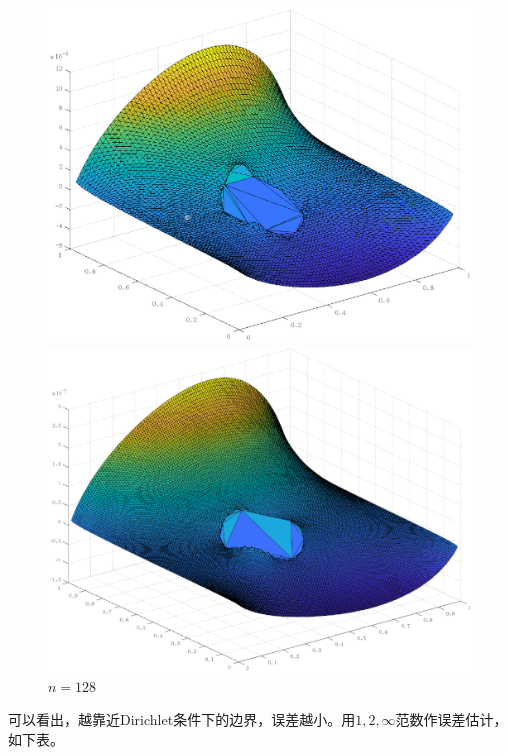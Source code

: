 \documentclass[lang=cn,11pt,a4paper]{elegantpaper}
\begin{document}
\begin{figure}[htbp]
\begin{minipage}[t]{0.24\linewidth}
    \includegraphics[width=0.95\linewidth]{figure/error_problem1_m_ir_n=64.eps}
    \caption*{$n=64$}
  \end{minipage}
  \begin{minipage}[t]{0.24\linewidth}
    \centering
    \includegraphics[width=0.95\linewidth]{figure/error_problem1_m_ir_n=128.eps}
    \caption*{$n=128$}
  \end{minipage}
\end{figure}

可以看出，越靠近Dirichlet条件下的边界，误差越小。用$1,2,\infty$范数作误差估计，如下表。
\end{document}
